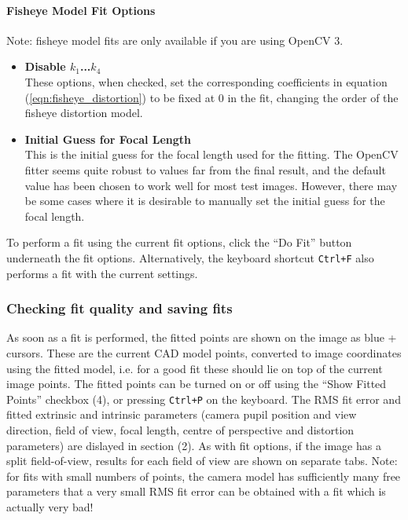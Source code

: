 \documentclass[12pt]{article}
\newcommand{\code}[1]{\texttt{#1}}
\begin{document}
\paragraph{Fisheye Model Fit Options}
Note: fisheye model fits are only available if you are using OpenCV 3.
\begin{itemize}
\item{\textbf{Disable $k_1$...$k_4$}\\These options, when checked, set the corresponding coefficients in equation (\ref{eqn:fisheye_distortion}) to be fixed at 0 in the fit, changing the order of the fisheye distortion model.}
\item{\textbf{Initial Guess for Focal Length}\\This is the initial guess for the focal length used for the fitting. The OpenCV fitter seems quite robust to values far from the final result, and the default value has been chosen to work well for most test images. However, there may be some cases where it is desirable to manually set the initial guess for the focal length.}
\end{itemize}

To perform a fit using the current fit options, click the ``Do Fit'' button underneath the fit options. Alternatively, the keyboard shortcut \code{Ctrl+F} also performs a fit with the current settings.

\subsubsection{Checking fit quality and saving fits}
As soon as a fit is performed, the fitted points are shown on the image as blue {\color{blue} +} cursors. These are the current CAD model points, converted to image coordinates using the fitted model, i.e. for a good fit these should lie on top of the current image points. The fitted points can be turned on or off using the ``Show Fitted Points'' checkbox (4), or pressing \code{Ctrl+P} on the keyboard. The RMS fit error and fitted extrinsic and intrinsic parameters (camera pupil position and view direction, field of view, focal length, centre of perspective and distortion parameters) are dislayed in section (2). As with fit options, if the image has a split field-of-view, results for each field of view are shown on separate tabs. Note: for fits with small numbers of points, the camera model has sufficiently many free parameters that a very small RMS fit error can be obtained with a fit which is actually very bad! 
\end{document}
